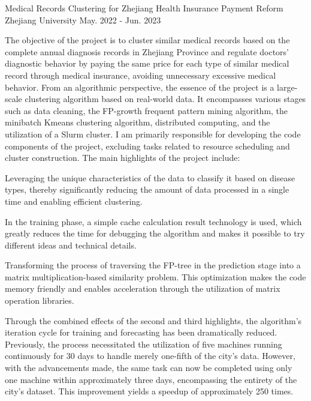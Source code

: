 
\begin{cventries}
	\cventry
	{} %
	{Medical Records Clustering for Zhejiang Health Insurance Payment Reform} %
	{Zhejiang University} %
	{May. 2022 - Jun. 2023} %
	{
		\quad The objective of the project is to cluster similar medical records based on the complete annual diagnosis records in Zhejiang Province and regulate doctors' diagnostic behavior by paying the same price for each type of similar medical record through medical insurance, avoiding unnecessary excessive medical behavior. \newline
		\quad From an algorithmic perspective, the essence of the project is a large-scale clustering algorithm based on real-world data. It encompasses various stages such as data cleaning, the FP-growth frequent pattern mining algorithm, the minibatch Kmeans clustering algorithm, distributed computing, and the utilization of a Slurm cluster. I am primarily responsible for developing the code components of the project, excluding tasks related to resource scheduling and cluster construction. \newline
		The main highlights of the project include: \newline
		\vspace{4mm}
		\begin{cvitems} %
			\item{Leveraging the unique characteristics of the data to classify it based on disease types, thereby significantly reducing the amount of data processed in a single time and enabling efficient clustering.}
			\item{In the training phase, a simple cache calculation result technology is used, which greatly reduces the time for debugging the algorithm and makes it possible to try different ideas and technical details.}
			\item{Transforming the process of traversing the FP-tree in the prediction stage into a matrix multiplication-based similarity problem. This optimization makes the code memory friendly and enables acceleration through the utilization of matrix operation libraries.}
			\item {Through the combined effects of the second and third highlights, the algorithm's iteration cycle for training and forecasting has been dramatically reduced. Previously, the process necessitated the utilization of five machines running continuously for 30 days to handle merely one-fifth of the city's data. However, with the advancements made, the same task can now be completed using only one machine within approximately three days, encompassing the entirety of the city's dataset. This improvement yields a speedup of approximately 250 times.}
		\end{cvitems}
		\vspace{2mm}
	}


\end{cventries}
